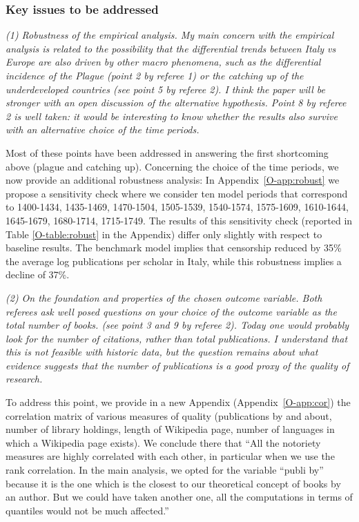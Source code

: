 \documentclass[12pt]{article}
\begin{document}
\subsubsection*{Key issues to be addressed}

\textit{
(1) Robustness of the empirical analysis. My main concern with the empirical analysis is related to the possibility that
the differential trends between Italy vs Europe are also driven by other macro phenomena,
such as the differential incidence of the Plague (point 2 by referee 1) or
the catching up of the underdeveloped countries (see point 5 by referee 2). I think
the paper will be stronger with an open discussion of the alternative hypothesis.
Point 8 by referee 2 is well taken: it would be interesting to know whether the
results also survive with an alternative choice of the time periods.}



Most of these points have been addressed in answering the first shortcoming above (plague and catching up). Concerning the choice of the time periods, we now provide an additional robustness analysis:  In Appendix~\ref{O-app:robust} we propose a sensitivity check where we consider ten model periods that correspond to 1400-1434, 1435-1469, 1470-1504, 1505-1539, 1540-1574, 1575-1609, 1610-1644, 1645-1679, 1680-1714, 1715-1749.  The results of this sensitivity check (reported in Table \ref{O-table:robust} in the Appendix) differ only slightly with respect to baseline results. The benchmark model implies that censorship reduced by 35\% the average log publications per scholar in Italy, while this robustness implies a decline of 37\%.



\textit{
(2) On the foundation and properties of the chosen outcome variable. Both referees
ask well posed questions on your choice of the outcome variable as the total
number of books. (see point 3 and 9 by referee 2). Today one would probably
look for the number of citations, rather than total publications. I understand that
this is not feasible with historic data, but the question remains about what evidence
suggests that the number of publications is a good proxy of the quality of research.}


To address this point, we provide in a new Appendix  (Appendix~\ref{O-app:cor}) the correlation matrix of various measures of quality (publications by and about, number of library holdings, length of Wikipedia page, number of languages in which a Wikipedia page exists).
We conclude there that ``All the notoriety measures are highly correlated with each other, in particular when we use the rank correlation. In the main analysis, we opted for the variable ``publi by'' because it is the one which is the closest to our theoretical concept of books by an author. But we could have taken another one, all the computations in terms of quantiles would not be much affected.''
\end{document}
